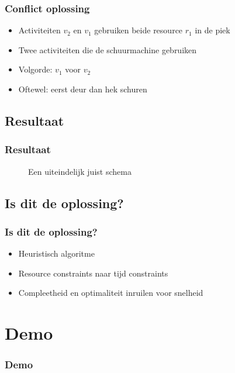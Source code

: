 \documentclass{beamer}
\theoremstyle{definition}
\newcommand{\inputtikz}[1]{}
\begin{document}
\begin{frame}
	\frametitle{Conflict oplossing}
	\begin{itemize}
		\item Activiteiten $v_2$ en $v_1$ gebruiken beide resource $r_1$ in de piek
		\item Twee activiteiten die de schuurmachine gebruiken
		\item<2-> Volgorde: $v_1$ voor $v_2$
		\item<2-> Oftewel: eerst deur dan hek schuren
	\end{itemize}
\end{frame}

\subsection{Resultaat}
\begin{frame}
	\frametitle{Resultaat}
	\vspace{-0.2em}
	\begin{figure}[ht]
		\makebox[\textwidth][c]{\resizebox{.38\paperwidth}{!}{
			\inputtikz{schedule_feasible_profile}
		}}
		\vspace{-1.3em}
		\caption{Een uiteindelijk juist schema}
	\end{figure}
\end{frame}

\subsection{Is dit de oplossing?}
\begin{frame}
	\frametitle{Is dit de oplossing?}
	\begin{itemize}
		\item Heuristisch algoritme
		\item Resource constraints naar tijd constraints
		\item Compleetheid en optimaliteit inruilen voor snelheid
	\end{itemize}
\end{frame}
	

\section{Demo}
\begin{frame}
	\frametitle{Demo}
\end{frame}
\end{document}
